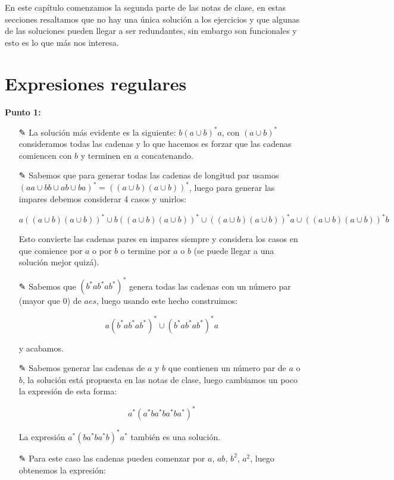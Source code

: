 En este capítulo comenzamos la segunda parte de las notas de clase, en estas secciones resaltamos que no hay una única solución a los ejercicios y que algunas de las soluciones pueden llegar a ser redundantes, sin embargo son funcionales y esto es lo que más nos interesa.

\section{Expresiones regulares}

\textbf{Punto 1:} \begin{itemize}
    \item [✎] La solución más evidente es la siguiente: $b(a\cup b)^*a$, con $(a\cup b)^*$ consideramos todas las cadenas y lo que hacemos es forzar que las cadenas comiencen con $b$ y terminen en $a$ concatenando.

    \item[✎] Sabemos que para generar todas las cadenas de longitud par usamos $(aa\cup bb\cup ab\cup ba)^*=((a\cup b)(a\cup b))^*$, luego para generar las impares debemos considerar 4 casos y unirlos:

    $$a((a\cup b)(a\cup b))^*\cup b((a\cup b)(a\cup b))^* \cup ((a\cup b)(a\cup b))^*a \cup ((a\cup b)(a\cup b))^*b$$

    Esto convierte las cadenas pares en impares siempre y considera los casos en que comience por $a$ o por $b$ o termine por $a$ o $b$ (se puede llegar a una solución mejor quizá).

    \item[✎] Sabemos que $(b^*ab^*ab^*)^*$ genera todas las cadenas con un número par (mayor que 0) de $aes$, luego usando este hecho construimos:

    $$a(b^*ab^*ab^*)^*\cup (b^*ab^*ab^*)^*a$$

    y acabamos.

    \item[✎] Sabemos generar las cadenas de $a$ y $b$ que contienen un número par de $a$ o $b$, la solución está propuesta en las notas de clase, luego cambiamos un poco la expresión de esta forma:

    $$a^*(a^*ba^*ba^*ba^*)^*$$

    La expresión $a^*(ba^*ba^*b)^*a^*$ también es una solución.

    \item[✎] Para este caso las cadenas pueden comenzar por $a$, $ab$, $b^2$, $a^2$, luego obtenemos la expresión:


\end{itemize}
